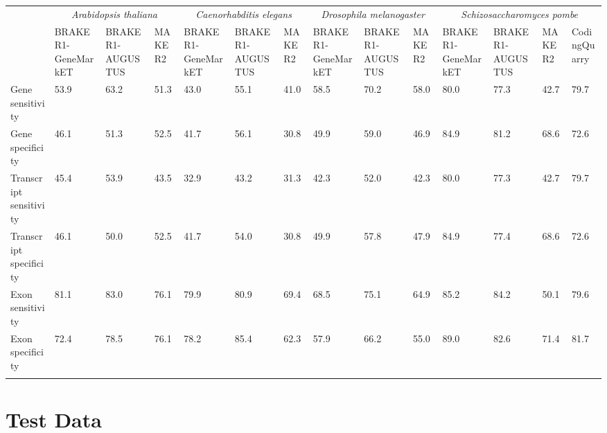 \documentclass{bioinfo}
\begin{document}
\begin{methods}
\begin{table}[!b]
{\begin{tabular}{lp{.9cm}p{.9cm}p{.9cm}p{.9cm}p{.9cm}p{.9cm}p{.9cm}p{.9cm}p{.9cm}p{.9cm}p{.9cm}p{.9cm}p{.9cm}}\toprule
 & \multicolumn{3}{c}{\textit{Arabidopsis thaliana}} &  \multicolumn{3}{c}{\textit{Caenorhabditis elegans}} &  \multicolumn{3}{c}{\textit{Drosophila melanogaster}} &  \multicolumn{4}{c}{\textit{Schizosaccharomyces pombe}}\\
 & \tiny{BRAKER1-GeneMarkET} & \tiny{BRAKER1-AUGUSTUS} & \tiny{MAKER2} & \tiny{BRAKER1-GeneMarkET} & \tiny{BRAKER1-AUGUSTUS} & \tiny{MAKER2} & \tiny{BRAKER1-GeneMarkET} & \tiny{BRAKER1-AUGUSTUS} & \tiny{MAKER2} & \tiny{BRAKER1-GeneMarkET} &\tiny{BRAKER1-AUGUSTUS} & \tiny{MAKER2} &\tiny{CodingQuarry}\\
 \midrule
Gene sensitivity & 53.9 & 63.2 & 51.3 & 43.0 & 55.1& 41.0 & 58.5& 70.2 & 58.0 & 80.0& 77.3  & 42.7 & 79.7\\
Gene specificity & 46.1 & 51.3 & 52.5& 41.7& 56.1& 30.8& 49.9 & 59.0 & 46.9& 84.9& 81.2& 68.6 & 72.6\\
Transcript sensitivity & 45.4 & 53.9 & 43.5& 32.9& 43.2& 31.3& 42.3 &52.0 & 42.3 & 80.0& 77.3& 42.7 & 79.7\\
Transcript specificity & 46.1 & 50.0 & 52.5& 41.7 & 54.0& 30.8 & 49.9 & 57.8 & 47.9 &84.9 & 77.4 & 68.6 & 72.6\\
Exon sensitivity & 81.1 & 83.0 & 76.1& 79.9& 80.9& 69.4 & 68.5& 75.1& 64.9& 85.2 & 84.2 & 50.1 & 79.6\\
Exon specificity & 72.4 & 78.5 & 76.1& 78.2& 85.4& 62.3 & 57.9 & 66.2 & 55.0 & 89.0& 82.6& 71.4 & 81.7\\
\botrule

\end{tabular}}{}
\end{table}

\section{Test Data}


\end{methods}
\end{document}
